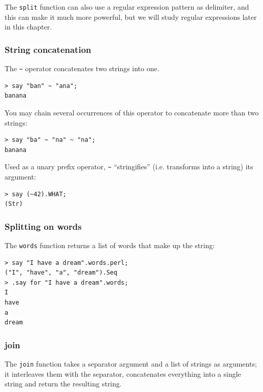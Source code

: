 The {\tt split} function can also use a regular expression 
pattern as delimiter, and this can make it much more powerful, 
but we will study regular expressions later in this chapter.

\subsubsection{String concatenation}


The \verb'~' operator concatenates two strings into one.

\begin{verbatim}
> say "ban" ~ "ana";
banana
\end{verbatim}
%

You may chain several occurrences of this operator to 
concatenate more than two strings:

\begin{verbatim}
> say "ba" ~ "na" ~ "na";
banana
\end{verbatim}
%

Used as a unary prefix operator,
\verb'~' ``stringifies'' (i.e. transforms into a string) its argument:

\begin{verbatim}
> say (~42).WHAT;
(Str)
\end{verbatim}
%

\subsubsection{Splitting on words}

The {\tt words} function returns a list of words that make 
up the string:

\begin{verbatim}
> say "I have a dream".words.perl;
("I", "have", "a", "dream").Seq
> .say for "I have a dream".words;
I
have
a
dream
\end{verbatim}
%

\subsubsection{join}

The {\tt join} function takes a separator argument and a list 
of strings as arguments; it interleaves them with the separator, 
concatenates everything into a single string and return the 
resulting string.

